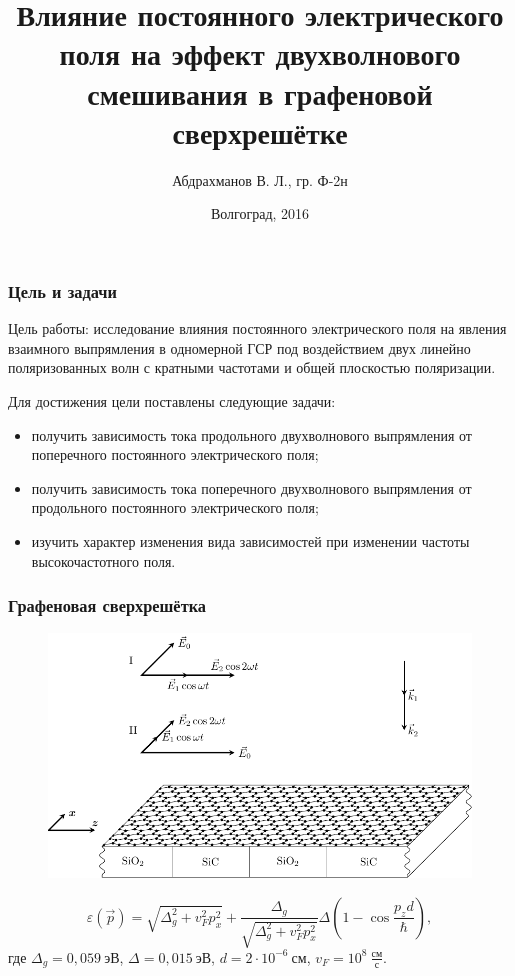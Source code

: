 \documentclass[10pt,pdf,intlimits]{beamer}
\date{Волгоград, 2016}
\title{Влияние постоянного электрического поля на эффект двухволнового смешивания в графеновой сверхрешётке}
\author{Абдрахманов В. Л., гр. Ф-2н}
\institute{Руководитель --- д.ф.-м.н. Завьялов Д. В.}
\newcommand{\eps}{\varepsilon}
\begin{document}
  \frame{\titlepage}
  \begin{frame}
  \frametitle{Цель и задачи}
  Цель работы: исследование влияния постоянного электрического поля на явления взаимного выпрямления в одномерной ГСР под воздействием двух линейно поляризованных волн с кратными частотами и общей плоскостью поляризации.

  \vspace*{4ex}
  Для достижения цели поставлены следующие задачи:
  \begin{itemize}
    \item получить зависимость тока продольного двухволнового выпрямления от поперечного постоянного электрического поля;
    \item получить зависимость тока поперечного двухволнового выпрямления от продольного постоянного электрического поля;
    \item изучить характер изменения вида зависимостей при изменении частоты высокочастотного поля.
  \end{itemize}
  \end{frame}
  \begin{frame}
    \frametitle{Графеновая сверхрешётка}
      \begin{figure}[h]
          \center
          \includegraphics[height=.5\textheight]{../figures/graphene.pdf}
      \end{figure}
    \begin{equation}
      \eps(\vec{p}) = \sqrt{\Delta_g^2 + v_F^2 p_x^2} + \frac{\Delta_g}{\sqrt{\Delta_g^2 + v_F^2 p_x^2}}\Delta\left(1-\cos\frac{p_z d}{\hbar}\right),
    \end{equation}
    где \( \Delta_g = 0,\!059~\text{эВ} \), \( \Delta = 0,\!015~\text{эВ} \), \( d = 2 \cdot 10^{-6}~\text{см} \), \( v_F = 10^8~\frac{\text{см}}{\text{с}} \).
  \end{frame}
\end{document}
